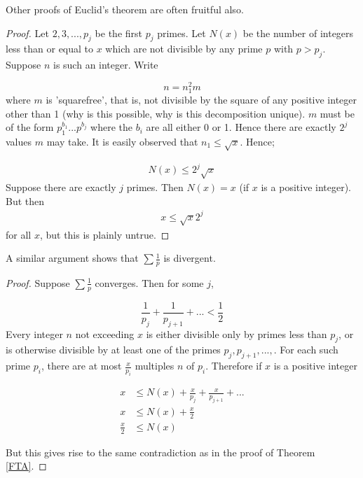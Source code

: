 Other proofs of Euclid's theorem are often fruitful also.

\begin{proof}
    Let $2,3,...,p_j$ be the first $p_j$ primes. Let $N(x)$ be the number of integers less than or equal to $x$ which are not divisible by any prime $p$ with 
    $p > p_j$. Suppose $n$ is such an integer. Write

    \begin{equation*}
        n = n_1^2 m
    \end{equation*}
    where $m$ is 'squarefree', that is, not divisible by the square of any positive integer other than 1 (why is this possible, why is this decomposition unique). 
    $m$ must be of the form $p_1^{b_1} ... p^{b_j}$ where the $b_i$ are all either 0 or 1. Hence there are exactly $2^j$ values $m$ may take. It is easily observed 
    that $n_1 \leq \sqrt{x}$. Hence;

    \begin{align*}
        N(x) \leq 2^j \sqrt{x}
    \end{align*}
    Suppose there are exactly $j$ primes. Then $N(x) = x$ (if $x$ is a positive integer). But then
    \begin{align*}
        x \leq \sqrt{x}2^j
    \end{align*}
    for all $x$, but this is plainly untrue.

\end{proof}

\begin{remark}
    A similar argument shows that $\sum\frac{1}{p}$ is divergent.
\end{remark}

\begin{proof}
    Suppose $\sum \frac{1}{p}$ converges. Then for some $j$,

    \begin{equation*}
        \frac{1}{p_j} + \frac{1}{p_{j+1}} + ... < \frac{1}{2}
    \end{equation*}
    Every integer $n$ not exceeding $x$ is either divisible only by primes less than $p_j$, or is otherwise divisible by at least one of the primes 
    $p_j,p_{j+1},...,$. For each such prime $p_i$, there are at most $\frac{x}{p_i}$ multiples $n$ of $p_i$. Therefore if $x$ is a positive integer 

    \begin{align*}
        x &\leq N(x) + \frac{x}{p_j} + \frac{x}{p_{j+1}} + ... \\
        x &\leq N(x) + \frac{x}{2} \\
        \frac{x}{2} &\leq N(x)
    \end{align*}

    \noi
    But this gives rise to the same contradiction as in the proof of Theorem \ref{FTA}.

\end{proof}

